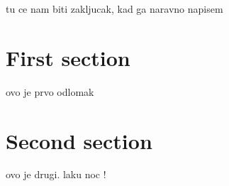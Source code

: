 \documentclass[../zavrsni.tex]{subfiles}
\begin{document}
tu ce nam biti zakljucak, kad ga naravno napisem

\section{First section}

ovo je prvo odlomak

\section{Second section}

ovo je drugi. laku noc !
\end{document}
